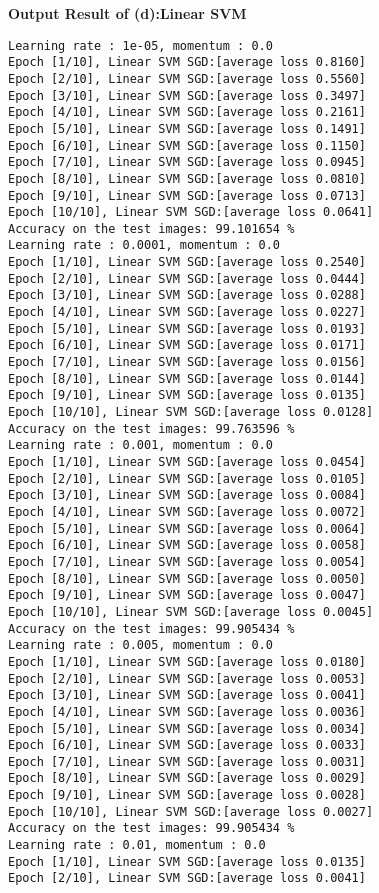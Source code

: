 \documentclass[10pt]{article}
\newcommand{\0}{{\mathbf{0}}}
\newcommand{\1}{{\mathbf{1}}}
\begin{document}
\newpage
\textbf{Output Result of (d):Linear SVM}
\begin{verbatim}
Learning rate : 1e-05, momentum : 0.0
Epoch [1/10], Linear SVM SGD:[average loss 0.8160]
Epoch [2/10], Linear SVM SGD:[average loss 0.5560]
Epoch [3/10], Linear SVM SGD:[average loss 0.3497]
Epoch [4/10], Linear SVM SGD:[average loss 0.2161]
Epoch [5/10], Linear SVM SGD:[average loss 0.1491]
Epoch [6/10], Linear SVM SGD:[average loss 0.1150]
Epoch [7/10], Linear SVM SGD:[average loss 0.0945]
Epoch [8/10], Linear SVM SGD:[average loss 0.0810]
Epoch [9/10], Linear SVM SGD:[average loss 0.0713]
Epoch [10/10], Linear SVM SGD:[average loss 0.0641]
Accuracy on the test images: 99.101654 %
Learning rate : 0.0001, momentum : 0.0
Epoch [1/10], Linear SVM SGD:[average loss 0.2540]
Epoch [2/10], Linear SVM SGD:[average loss 0.0444]
Epoch [3/10], Linear SVM SGD:[average loss 0.0288]
Epoch [4/10], Linear SVM SGD:[average loss 0.0227]
Epoch [5/10], Linear SVM SGD:[average loss 0.0193]
Epoch [6/10], Linear SVM SGD:[average loss 0.0171]
Epoch [7/10], Linear SVM SGD:[average loss 0.0156]
Epoch [8/10], Linear SVM SGD:[average loss 0.0144]
Epoch [9/10], Linear SVM SGD:[average loss 0.0135]
Epoch [10/10], Linear SVM SGD:[average loss 0.0128]
Accuracy on the test images: 99.763596 %
Learning rate : 0.001, momentum : 0.0
Epoch [1/10], Linear SVM SGD:[average loss 0.0454]
Epoch [2/10], Linear SVM SGD:[average loss 0.0105]
Epoch [3/10], Linear SVM SGD:[average loss 0.0084]
Epoch [4/10], Linear SVM SGD:[average loss 0.0072]
Epoch [5/10], Linear SVM SGD:[average loss 0.0064]
Epoch [6/10], Linear SVM SGD:[average loss 0.0058]
Epoch [7/10], Linear SVM SGD:[average loss 0.0054]
Epoch [8/10], Linear SVM SGD:[average loss 0.0050]
Epoch [9/10], Linear SVM SGD:[average loss 0.0047]
Epoch [10/10], Linear SVM SGD:[average loss 0.0045]
Accuracy on the test images: 99.905434 %
Learning rate : 0.005, momentum : 0.0
Epoch [1/10], Linear SVM SGD:[average loss 0.0180]
Epoch [2/10], Linear SVM SGD:[average loss 0.0053]
Epoch [3/10], Linear SVM SGD:[average loss 0.0041]
Epoch [4/10], Linear SVM SGD:[average loss 0.0036]
Epoch [5/10], Linear SVM SGD:[average loss 0.0034]
Epoch [6/10], Linear SVM SGD:[average loss 0.0033]
Epoch [7/10], Linear SVM SGD:[average loss 0.0031]
Epoch [8/10], Linear SVM SGD:[average loss 0.0029]
Epoch [9/10], Linear SVM SGD:[average loss 0.0028]
Epoch [10/10], Linear SVM SGD:[average loss 0.0027]
Accuracy on the test images: 99.905434 %
Learning rate : 0.01, momentum : 0.0
Epoch [1/10], Linear SVM SGD:[average loss 0.0135]
Epoch [2/10], Linear SVM SGD:[average loss 0.0041]

\end{verbatim}
\end{document}
